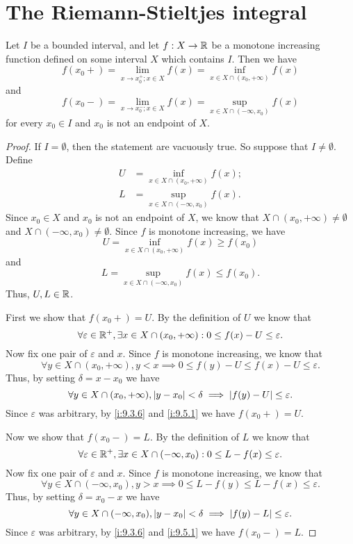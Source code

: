 \section{The Riemann-Stieltjes integral}\label{i:sec:11.8}

\begin{ac}\label{i:ac:11.8.1}
  Let \(I\) be a bounded interval, and let \(f : X \to \mathbb{R}\) be a monotone increasing function defined on some interval \(X\) which contains \(I\).
  Then we have
  \[
    f(x_0+) = \lim_{x \to x_0^+ ; x \in X} f(x) = \inf_{x \in X \cap (x_0, +\infty)} f(x)
  \]
  and
  \[
    f(x_0-) = \lim_{x \to x_0^- ; x \in X} f(x) = \sup_{x \in X \cap (-\infty, x_0)} f(x)
  \]
  for every \(x_0 \in I\) and \(x_0\) is not an endpoint of \(X\).
\end{ac}

\begin{proof}
  If \(I = \emptyset\), then the statement are vacuously true.
  So suppose that \(I \neq \emptyset\).
  Define
  \begin{align*}
    U & = \inf_{x \in X \cap (x_0, +\infty)} f(x); \\
    L & = \sup_{x \in X \cap (-\infty, x_0)} f(x).
  \end{align*}
  Since \(x_0 \in X\) and \(x_0\) is not an endpoint of \(X\), we know that \(X \cap (x_0, +\infty) \neq \emptyset\) and \(X \cap (-\infty, x_0) \neq \emptyset\).
  Since \(f\) is monotone increasing, we have
  \[
    U = \inf_{x \in X \cap (x_0, +\infty)} f(x) \geq f(x_0)
  \]
  and
  \[
    L = \sup_{x \in X \cap (-\infty, x_0)} f(x) \leq f(x_0).
  \]
  Thus, \(U, L \in \mathbb{R}\).

  First we show that \(f(x_0+) = U\).
  By the definition of \(U\) we know that
  \[
    \forall \varepsilon \in \mathbb{R}^+, \exists x \in X \cap (x_0, +\infty) : 0 \leq f(x) - U \leq \varepsilon.
  \]
  Now fix one pair of \(\varepsilon\) and \(x\).
  Since \(f\) is monotone increasing, we know that
  \[
    \forall y \in X \cap (x_0, +\infty), y < x \implies 0 \leq f(y) - U \leq f(x) - U \leq \varepsilon.
  \]
  Thus, by setting \(\delta = x - x_0\) we have
  \[
    \forall y \in X \cap (x_0, +\infty), \left\lvert y - x_0\right\rvert < \delta \implies \left\lvert f(y) - U\right\rvert \leq \varepsilon.
  \]
  Since \(\varepsilon\) was arbitrary, by \cref{i:9.3.6} and \cref{i:9.5.1} we have \(f(x_0+) = U\).

  Now we show that \(f(x_0-) = L\).
  By the definition of \(L\) we know that
  \[
    \forall \varepsilon \in \mathbb{R}^+, \exists x \in X \cap (-\infty, x_0) : 0 \leq L - f(x) \leq \varepsilon.
  \]
  Now fix one pair of \(\varepsilon\) and \(x\).
  Since \(f\) is monotone increasing, we know that
  \[
    \forall y \in X \cap (-\infty, x_0), y > x \implies 0 \leq L - f(y) \leq L - f(x) \leq \varepsilon.
  \]
  Thus, by setting \(\delta = x_0 - x\) we have
  \[
    \forall y \in X \cap (-\infty, x_0), \left\lvert y - x_0\right\rvert < \delta \implies \left\lvert f(y) - L\right\rvert \leq \varepsilon.
  \]
  Since \(\varepsilon\) was arbitrary, by \cref{i:9.3.6} and \cref{i:9.5.1} we have \(f(x_0-) = L\).
\end{proof}

